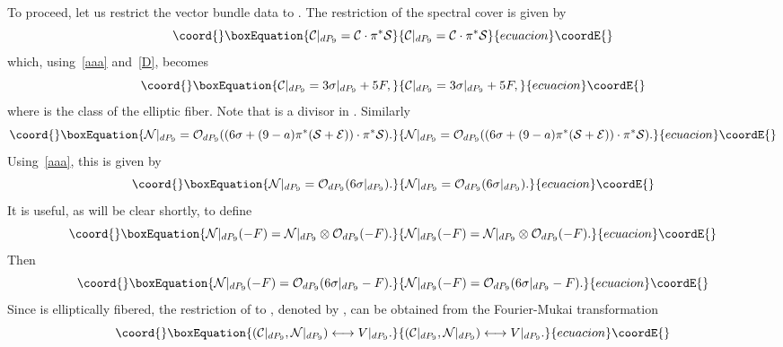 \documentclass[a4paper,12pt]{article}
\numberwithin{equation}{section}
\theoremstyle{plain}
\begin{document}
To proceed, let us restrict the vector bundle data to
\coordHE{}. The restriction of the spectral cover is given by
%
\begin{equation}\coord{}\boxEquation{
{\cal C}|_{dP_9} = {\cal C}\cdot \pi^{*}{\cal S}
\label{42}
}{
{\cal C}|_{dP_9} = {\cal C}\cdot \pi^{*}{\cal S}
}{ecuacion}\coordE{}\end{equation}
%
which, using~\eqref{aaa} and~\eqref{D}, becomes
%
\begin{equation}\coord{}\boxEquation{
{\cal C}|_{dP_9} = 3 \sigma|_{dP_9} + 5 F,
\label{43}
}{
{\cal C}|_{dP_9} = 3 \sigma|_{dP_9} + 5 F,
}{ecuacion}\coordE{}\end{equation}
%
where \coordHE{} is the class of the elliptic fiber. Note that
\coordHE{} is a divisor in \coordHE{}. Similarly
%
\begin{equation}\coord{}\boxEquation{
{\cal N}|_{dP_9} = {\cal O}_{dP_9} ((6\sigma +(9-a)
\pi^{*} ({\cal S}+{\cal E}))\cdot \pi^{*}{\cal S}).
\label{44}
}{
{\cal N}|_{dP_9} = {\cal O}_{dP_9} ((6\sigma +(9-a)
\pi^{*} ({\cal S}+{\cal E}))\cdot \pi^{*}{\cal S}).
}{ecuacion}\coordE{}\end{equation}
%
Using~\eqref{aaa}, this is given by
%
\begin{equation}\coord{}\boxEquation{
{\cal N}|_{dP_9} = {\cal O}_{dP_9} (6\sigma|_{dP_9}).
\label{bbb}
}{
{\cal N}|_{dP_9} = {\cal O}_{dP_9} (6\sigma|_{dP_9}).
}{ecuacion}\coordE{}\end{equation}
%
It is useful, as will be clear shortly, to define
%
\begin{equation}\coord{}\boxEquation{
{\cal N}|_{dP_9}(-F) ={\cal N}|_{dP_9} \otimes {\cal O}_{dP_9} (-F).
\label{ddd}
}{
{\cal N}|_{dP_9}(-F) ={\cal N}|_{dP_9} \otimes {\cal O}_{dP_9} (-F).
}{ecuacion}\coordE{}\end{equation}
%
Then
%
\begin{equation}\coord{}\boxEquation{
{\cal N}|_{dP_9}(-F) ={\cal O}_{dP_9} (6\sigma|_{dP_9}-F).
\label{eee}
}{
{\cal N}|_{dP_9}(-F) ={\cal O}_{dP_9} (6\sigma|_{dP_9}-F).
}{ecuacion}\coordE{}\end{equation}
%
Since \coordHE{} is elliptically fibered, the restriction of \coordHE{} to
\coordHE{}, denoted by \coordHE{}, can be obtained from the Fourier-Mukai
transformation
%
\begin{equation}\coord{}\boxEquation{
({\cal C}|_{dP_9}, {\cal N}|_{dP_9}) \longleftrightarrow V|_{dP_9}.
\label{45}
}{
({\cal C}|_{dP_9}, {\cal N}|_{dP_9}) \longleftrightarrow V|_{dP_9}.
}{ecuacion}\coordE{}\end{equation}
%
\end{document}
